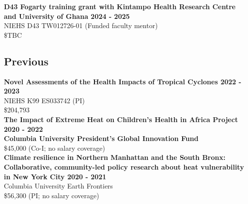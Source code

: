 \noindent \textbf{D43 Fogarty training grant with Kintampo Health Research Centre and University of Ghana \hfill 2024 - 2025} \\
NIEHS D43 TW012726-01 (Funded faculty mentor)\\
\$TBC 

\subsection*{Previous}


\noindent \textbf{Novel Assessments of the Health Impacts of Tropical Cyclones \hfill 2022 - 2023}\\ 
NIEHS K99 ES033742 (PI)\\ 
\$204,793 \\


\noindent \textbf{The Impact of Extreme Heat on Children’s Health in Africa Project \hfill 2020 - 2022\\ 
Columbia University President’s Global Innovation Fund} \\
\$45,000 (Co-I; no salary coverage)\\

\noindent \textbf{Climate resilience in Northern Manhattan and the South Bronx: Collaborative, community-led policy research about heat vulnerability in New York City \hfill 2020 - 2021 } \\
Columbia University Earth Frontiers \\ 
\$56,300 (PI; no salary coverage) \\

